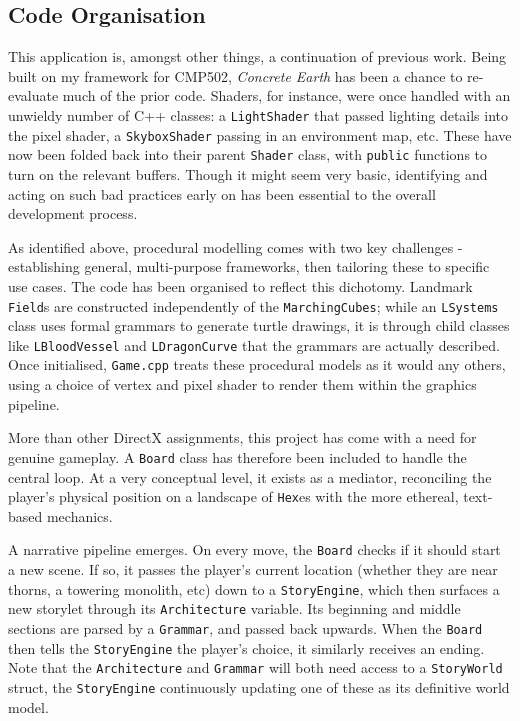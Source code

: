 \documentclass[a4paper, 11pt]{article}
\begin{document}
\begin{flushleft}
\section{Code Organisation}

This application is, amongst other things, a continuation of previous work. Being built on my framework for CMP502, \textit{Concrete Earth} has been a chance to re-evaluate much of the prior code. Shaders, for instance, were once handled with an unwieldy number of C++ classes: a \texttt{LightShader} that passed lighting details into the pixel shader, a \texttt{SkyboxShader} passing in an environment map, etc. These have now been folded back into their parent \texttt{Shader} class, with \texttt{public} functions to turn on the relevant buffers. Though it might seem very basic, identifying and acting on such bad practices early on has been essential to the overall development process.

\vspace{5pt}\noindent
As identified above, procedural modelling comes with two key challenges - establishing general, multi-purpose frameworks, then tailoring these to specific use cases. The code has been organised to reflect this dichotomy. Landmark \texttt{Field}s are constructed independently of the \texttt{MarchingCubes}; while an \texttt{LSystems} class uses formal grammars to generate turtle drawings, it is through child classes like \texttt{LBloodVessel} and \texttt{LDragonCurve} that the grammars are actually described. Once initialised, \texttt{Game.cpp} treats these procedural models as it would any others, using a choice of vertex and pixel shader to render them within the graphics pipeline.

\vspace{5pt}\noindent
More than other DirectX assignments, this project has come with a need for genuine gameplay. A \texttt{Board} class has therefore been included to handle the central loop. At a very conceptual level, it exists as a mediator, reconciling the player's physical position on a landscape of \texttt{Hex}es with the more ethereal, text-based mechanics. 

\vspace{5pt}\noindent
A narrative pipeline emerges. On every move, the \texttt{Board} checks if it should start a new scene. If so, it passes the player's current location (whether they are near thorns, a towering monolith, etc) down to a \texttt{StoryEngine}, which then surfaces a new storylet through its \texttt{Architecture} variable. Its beginning and middle sections are parsed by a \texttt{Grammar}, and passed back upwards. When the \texttt{Board} then tells the \texttt{StoryEngine} the player's choice, it similarly receives an ending. Note that the \texttt{Architecture} and \texttt{Grammar} will both need access to a \texttt{StoryWorld} struct, the \texttt{StoryEngine} continuously updating one of these as its definitive world model.


\end{flushleft}
\end{document}
